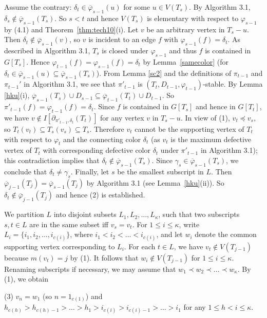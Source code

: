 \documentclass[11pt]{article}
\newcommand{\phibar}{\overline{\varphi}}
\newcommand{\phiv}{\varphi}
\begin{document}
Assume the contrary: $\delta_{t}\in  \phibar_{s-1}(u)$ for some $u\in V(T_s)$. By Algorithm 3.1, $\delta_s \notin \phibar_{s-1}(T_s)$.
So $s<t$ and hence $V(T_s)$ is elementary with respect to $\varphi_{s-1}$ by (4.1) and Theorem~\ref{thm:tech10}(i). Let $v$ be an 
arbitrary vertex in $T_s-u$. Then $\delta_t \notin \phibar_{s-1}(v)$, so $v$ is incident to an edge $f$ with 
$\varphi_{s-1}(f)=\delta_t$. As described in Algorithm 3.1, $T_{s}$ is closed under $\varphi_{s-1}$ and thus $f$ is 
contained in $G[T_{s}]$. Hence $\varphi_{t-1}(f) = \phiv_{s -1}(f)=\delta_t$ by Lemma~\ref{samecolor} (for $\delta_{t}\in  \phibar_{s-1}(u)
\subseteq \phibar_{s-1}(T_s)$). From Lemma \ref{sc2} and the definitions of $\pi_{t-1}$ and $\pi_{t-1}'$ in Algorithm 3.1, we see that $\pi'_{t-1}$ is $(T_{t}, D_{t-1}, 
\phiv_{t-1})$-stable. By Lemma \ref{hku}(i), $\phibar_{s-1}(T_s)\cup D_{s-1}\subseteq \phibar_{t-1}(T_t)\cup D_{t-1}$. 
So $\pi'_{t-1}(f) =\phiv_{t-1}(f)=\delta_t$.  Since $f$ is contained in $G[T_s]$ and hence in $G[T_t]$, we have 
$v \not\in I[\partial_{\pi'_{t-1},  \delta_{t}}(T_{t})]$ for any vertex $v$ in $T_s-u$. In view of (1), $v_t \preceq v_s$, so
$T_t(v_t) \subseteq T_s(v_s) \subseteq T_s$. Therefore $v_t$ cannot be the supporting vertex of $T_{t}$ with respect to $\phiv_{t}$ and 
the connecting color $\delta_{t}$ (as $v_t$ is the maximum defective vertex of $T_t$ with corresponding defective color $\delta_t$ 
under $\pi'_{t-1}$ in Algorithm 3.1); this contradiction implies that $\delta_{t}\notin \phibar_{s-1}(T_s)$. Since $\gamma_s \in \phibar_{s-1}(T_s)$,
we conclude that $\delta_t\ne \gamma_s$. Finally, let $s$ be the smallest subscript in $L$. Then $\phibar_{j-1}(T_j)=\phibar_{s-1}(T_j)$
by Algorithm 3.1 (see Lemma~\ref{hku}(ii)). So $\delta_t \notin \phibar_{j-1}(T_j)$ and hence (2) is established. 

We partition $L$ into disjoint subsets $L_1, L_2, \dots, L_{\kappa}$, such that two subscripts $s, t\in L$ are in the same subset iff $v_s = v_t$.  
For $1\le i \le \kappa$, write $L_i=\{i_1,i_2, \ldots,i_{c(i)}\}$, where $i_1<i_2< \ldots <i_{c(i)}$, and let $w_i$ denote the 
common supporting vertex corresponding to $L_i$. For each $t \in L$, we have $v_t \notin V(T_{j-1})$ because $m(v_t)=j$ by (1). It follows that 
$w_i \notin V(T_{j-1})$ for $1\le i \le \kappa$.  Renaming subscripts if necessary, we may assume that $w_1\prec w_2\prec \ldots \prec w_{\kappa}$.  
By (1), we obtain

(3) $v_n = w_1$ (so $n=1_{c(1)}$) and $h_{c(h)} > h_{c(h)-1}> \ldots > h_1 > i_{c(i)} > i_{c(i)-1} > \ldots > i_1$ for any $1\le h<i \le \kappa$.
\end{document}
